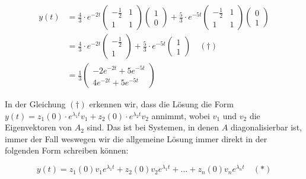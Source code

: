 \begin{equation*}
    \begin{aligned}
        y(t) &= \frac{4}{3} \cdot e^{-2t}
        \begin{pmatrix}
            -\frac{1}{2} & 1 \\
            1 & 1
        \end{pmatrix}
        \begin{pmatrix}
            1 \\
            0
        \end{pmatrix} + \frac{5}{3} \cdot e^{-5t}
        \begin{pmatrix}
            -\frac{1}{2} & 1 \\
            1 & 1
        \end{pmatrix}
        \begin{pmatrix}
            0 \\
            1
        \end{pmatrix} \\[0.5em]
        &= \frac{4}{3} \cdot e^{-2t} \begin{pmatrix}
            -\frac{1}{2} \\ 1
        \end{pmatrix} + \frac{5}{3} \cdot e^{-5t} \begin{pmatrix}
            1 \\ 1
        \end{pmatrix} \quad (\dagger) \\[0.5em]
        &= \frac{1}{3} \begin{pmatrix}
            -2 e^{-2t} + 5 e^{-5t} \\
            4 e^{-2t} + 5 e^{-5t}
        \end{pmatrix} 
    \end{aligned}
\end{equation*}

In der Gleichung \( (\dagger) \) erkennen wir, dass die Lösung die Form \( y (t) = z_1(0) \cdot e^{\lambda_1 t} v_1 + z_2(0) \cdot e^{\lambda_2 t} v_2 \) annimmt, wobei \( v_1 \) und \( v_2 \) die Eigenvektoren von \( A_2 \) sind. Das ist bei Systemen, in denen \( A \) diagonalisierbar ist, immer der Fall weswegen wir die allgemeine Lösung immer direkt in der folgenden Form schreiben können: 

\begin{equation*}
    y(t) = z_1(0) v_1 e^{\lambda_1 t} + z_2(0) v_2 e^{\lambda_1 t} + \ldots + z_n(0) v_n e^{\lambda_n t} \quad (*)
\end{equation*}

